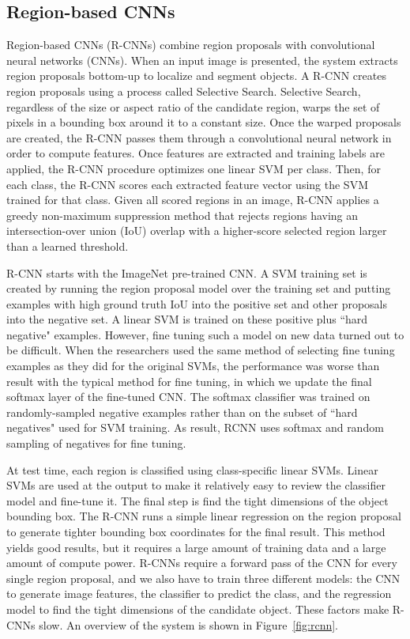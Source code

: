 \subsection{Region-based CNNs}
Region-based CNNs (R-CNNs) \cite{girshick2014rich} combine region proposals with convolutional neural networks (CNNs). When an input image is presented, the system extracts region proposals bottom-up to localize and segment objects. A R-CNN creates region proposals using a process called Selective Search. Selective Search, regardless of the size or aspect ratio of the candidate region, warps the set of pixels in a bounding box around it to a constant size. Once the warped proposals are created, the R-CNN passes them through a convolutional neural network in order to compute features. Once features are extracted and training labels are applied, the R-CNN procedure optimizes one linear SVM per class. Then, for each class, the R-CNN scores each extracted feature vector using the SVM trained for that class. Given all scored regions in an image, R-CNN applies a greedy non-maximum suppression method that rejects regions having an intersection-over union (IoU) overlap with a higher-score selected region larger than a learned threshold. 

R-CNN starts with the ImageNet pre-trained CNN. A SVM training set is created by running the region proposal model over the training set and putting examples with high ground truth IoU into the positive set and other proposals into the negative set. A linear SVM is trained on these positive plus \textquotedblleft hard negative" examples. However, fine tuning such a model on new data turned out to be difficult. When the researchers used the same method of selecting fine tuning examples as they did for the original SVMs, the performance was worse than result with the typical method for fine tuning, in which we update the final softmax layer of the fine-tuned CNN. The softmax classifier was trained on randomly-sampled negative examples rather than on the subset of \textquotedblleft hard negatives" used for SVM training. As result, RCNN uses softmax and random sampling of negatives for fine tuning.

At test time, each region is classified using class-specific linear SVMs. Linear SVMs are used at the output to make it relatively easy to review the classifier model and fine-tune it. The final step is find the tight dimensions of the object bounding box. The R-CNN runs a simple linear regression on the region proposal to generate tighter bounding box coordinates for the final result. This method yields good results, but it requires a large amount of training data and a large amount of compute power. R-CNNs require a forward pass of the CNN for every single region proposal, and we also have to train three different models: the CNN to generate image features, the classifier to predict the class, and the regression model to find the tight dimensions of the candidate object. These factors make R-CNNs slow. An overview of the system is shown in Figure~\ref{fig:rcnn}.

